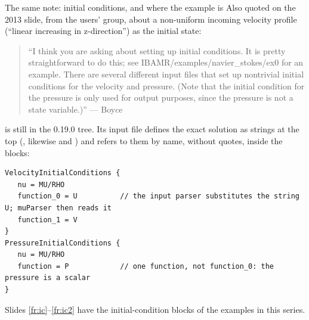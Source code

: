 \documentclass[aspectratio=169,11pt]{beamer}
\begin{document}
\begin{frame}[fragile]{The same note: initial conditions, and where the example is}
\label{fr:ex0}
\small Also quoted on the 2013 slide, from the users' group, about a non-uniform incoming velocity profile (``linear increasing in z-direction'') as the initial state:
\begin{quote}\footnotesize
``I think you are asking about setting up initial conditions. It is pretty straightforward to do this; see IBAMR/examples/navier\_stokes/ex0 for an example. There are several different input files that set up nontrivial initial conditions for the velocity and pressure. (Note that the initial condition for the pressure is only used for output purposes, since the pressure is not a state variable.)'' --- Boyce
\end{quote}
 is still in the 0.19.0 tree. Its input file defines the exact solution as strings at the top (, likewise  and ) and refers to them by name, without quotes, inside the blocks:
\begin{lstlisting}[style=inputtiny]
VelocityInitialConditions {
   nu = MU/RHO
   function_0 = U          // the input parser substitutes the string U; muParser then reads it
   function_1 = V
}
PressureInitialConditions {
   nu = MU/RHO
   function = P            // one function, not function_0: the pressure is a scalar
}
\end{lstlisting}
Slides \ref{fr:ic}--\ref{fr:ic2} have the initial-condition blocks of the examples in this series.
\end{frame}
\end{document}
